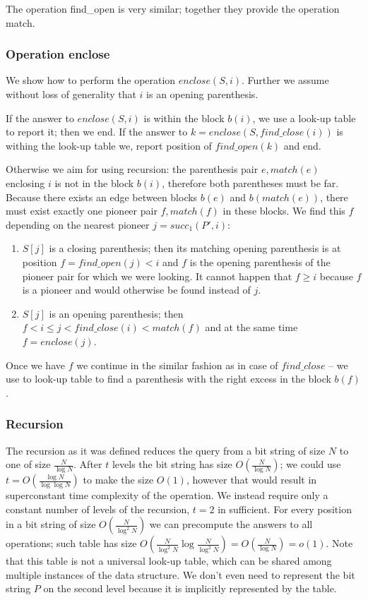 The operation find\_open is very similar; together they provide the operation match.

\subsubsection{Operation enclose}

We show how to perform the operation $enclose(S, i)$.
Further we assume without loss of generality that $i$ is an opening parenthesis.

If the answer to $enclose(S, i)$ is within the block $b(i)$, we use a look-up table to report it; then we end.
If the answer to $k = enclose(S, find\_close(i))$ is withing the look-up table we, report position of $find\_open(k)$ and end.

Otherwise we aim for using recursion: the parenthesis pair $e, match(e)$ enclosing $i$ is not in the block $b(i)$, therefore both parentheses must be far.
Because there exists an edge between blocks $b(e)$ and $b(match(e))$, there must exist exactly one pioneer pair $f, match(f)$ in these blocks.
We find this $f$ depending on the nearest pioneer $j = succ_1(P', i)$:
\begin{enumerate}
	\item $S[j]$ is a closing parenthesis; then its matching opening parenthesis is at position $f = find\_open(j) < i$ and $f$ is the opening parenthesis of the pioneer pair for which we were looking.
	It cannot happen that $f \ge i$ because $f$ is a pioneer and would otherwise be found instead of $j$.
	\item $S[j]$ is an opening parenthesis; then $f < i \le j < find\_close(i) < match(f)$ and at the same time $f = enclose(j)$.
\end{enumerate}
Once we have $f$ we continue in the similar fashion as in case of $find\_close$ --  we use to look-up table to find a parenthesis with the right excess in the block $b(f)$.

\subsubsection{Recursion}

The recursion as it was defined reduces the query from a bit string of size $N$ to one of size $\frac{N}{\log N}$.
After $t$ levels the bit string has size $O(\frac{N}{\log N})$; we could use $t = O(\frac{\log N}{\log\log N})$ to make the size $O(1)$, however that would result in superconstant time complexity of the operation.
We instead require only a constant number of levels of the recursion, $t = 2$ in sufficient.
For every position in a bit string of size $O(\frac{N}{\log^2 N})$ we can precompute the answers to all operations; such table has size $O(\frac{N}{\log^2 N} \log \frac{N}{\log^2 N}) = O(\frac{N}{\log N}) = o(1)$.
Note that this table is not a universal look-up table, which can be shared among multiple instances of the data structure.
We don't even need to represent the bit string $P$ on the second level because it is implicitly represented by the table.

